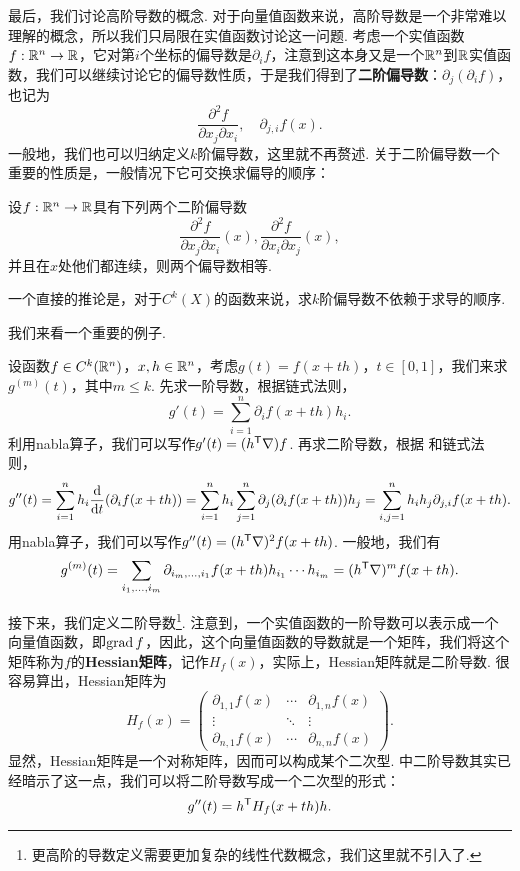 最后，我们讨论高阶导数的概念. 对于向量值函数来说，高阶导数是一个非常难以理解的概念，所以我们只局限在实值函数讨论这一问题. 考虑一个实值函数$f:\mathbb{R}^n\to\mathbb{R}$，它对第$i$个坐标的偏导数是$\partial_i f$，注意到这本身又是一个$\mathbb{R}^n$到$\mathbb{R}$实值函数，我们可以继续讨论它的偏导数性质，于是我们得到了\textbf{二阶偏导数}：$\partial_j(\partial_i f)$，也记为
\[\frac{\partial^2 f}{\partial x_j\partial x_i},\quad\partial_{j,i} f(x).\]
一般地，我们也可以归纳定义$k$阶偏导数，这里就不再赘述. 关于二阶偏导数一个重要的性质是，一般情况下它可交换求偏导的顺序：

\begin{proposition}\label{prop:partial-commute}
    设$f:\mathbb{R}^n\to\mathbb{R}$具有下列两个二阶偏导数
    \[\frac{\partial^2 f}{\partial x_j\partial x_i}(x),\frac{\partial^2 f}{\partial x_i\partial x_j}(x),\]
    并且在$x$处他们都连续，则两个偏导数相等.
\end{proposition}
一个直接的推论是，对于$C^k(X)$的函数来说，求$k$阶偏导数不依赖于求导的顺序. 

我们来看一个重要的例子. 
\begin{example}\label{ex:multi-taylor}
设函数$f\in C^k(\mathbb{R}^n)$，$x,h\in\mathbb{R}^n$，考虑$g(t)=f(x+th)$，$t\in[0,1]$，我们来求$g^{(m)}(t)$，其中$m\leq k$. 先求一阶导数，根据链式法则，
\[g'(t)=\sum_{i=1}^n\partial_i f(x+th)h_i.\]
利用nabla算子，我们可以写作$g'(t)=(h^{\mathsf{T}}\nabla) f$.
再求二阶导数，根据 和链式法则，
\[g''(t)=\sum_{i=1}^nh_i\frac{\mathrm{d}}{\mathrm{d} t}(\partial_i f(x+th))=\sum_{i=1}^nh_i\sum_{j=1}^n\partial_j(\partial_i f(x+th))h_j=\sum_{i,j=1}^nh_ih_j\partial_{j,i}f(x+th).\]
用nabla算子，我们可以写作$g''(t)=(h^{\mathsf{T}}\nabla)^2f(x+th)$. 一般地，我们有
\[g^{(m)}(t)=\sum_{i_1,\dots,i_m}\partial_{i_m,\dots,i_1}f(x+th)h_{i_1}\cdots h_{i_m}=(h^{\mathsf{T}}\nabla)^mf(x+th).\]
\end{example}

接下来，我们定义二阶导数\footnote{更高阶的导数定义需要更加复杂的线性代数概念，我们这里就不引入了. }. 注意到，一个实值函数的一阶导数可以表示成一个向量值函数，即$\operatorname*{grad} f$，因此，这个向量值函数的导数就是一个矩阵，我们将这个矩阵称为$f$的\textbf{Hessian矩阵}，记作$H_f(x)$，实际上，Hessian矩阵就是二阶导数. 很容易算出，Hessian矩阵为
\[H_f(x)=\begin{pmatrix}
    \partial_{1,1}f(x) & \cdots & \partial_{1,n}f(x) \\
    \vdots & \ddots & \vdots \\
    \partial_{n,1}f(x) & \cdots & \partial_{n,n}f(x)
\end{pmatrix}.\]
显然，Hessian矩阵是一个对称矩阵，因而可以构成某个二次型.  中二阶导数其实已经暗示了这一点，我们可以将二阶导数写成一个二次型的形式：
\[g''(t)=h^{\mathsf{T}} H_f(x+th)h.\]

